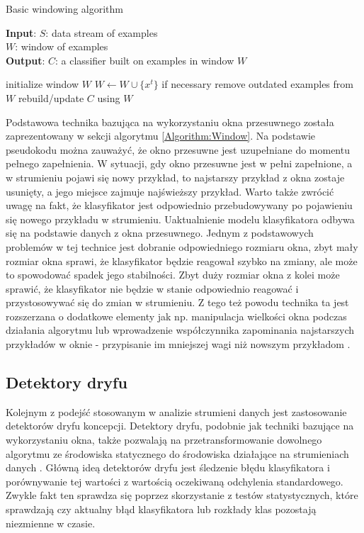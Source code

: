 \newpage

\begin{algorithm}
    \caption{Basic windowing algorithm \cite{BrzezPhd2015}}\label{Algorithm:Window}
    \textbf{Input}: $S$: data stream of examples \\
    \hspace*{12mm} $W$: window of examples \\
    \textbf{Output}: $C$: a classifier built on examples in window $W$ \\
    \begin{algorithmic}[1]
    \State initialize window $W$
    \State $W \gets W \cup \{x^t\}$
    \State if necessary remove outdated examples from $W$
    \State rebuild/update $C$ using $W$
    \EndFor
    \end{algorithmic}
\end{algorithm}

\noindent Podstawowa technika bazująca na wykorzystaniu okna przesuwnego została zaprezentowany w sekcji algorytmu \ref{Algorithm:Window}. Na podstawie pseudokodu można zauważyć, że okno przesuwne jest uzupełniane do momentu pełnego zapełnienia. W sytuacji, gdy okno przesuwne jest w pełni zapełnione, a w strumieniu pojawi się nowy przykład, to najstarszy przykład z okna zostaje usunięty, a jego miejsce zajmuje najświeższy przykład. Warto także zwrócić uwagę na fakt, że klasyfikator jest odpowiednio przebudowywany po pojawieniu się nowego przykładu w strumieniu. Uaktualnienie modelu klasyfikatora odbywa się na podstawie danych z okna przesuwnego. Jednym z podstawowych problemów w tej technice jest dobranie odpowiedniego rozmiaru okna, zbyt mały rozmiar okna sprawi, że klasyfikator będzie reagował szybko na zmiany, ale może to spowodować spadek jego stabilności. Zbyt duży rozmiar okna z kolei może sprawić, że klasyfikator nie będzie w stanie odpowiednio reagować i przystosowywać się do zmian w strumieniu. Z tego też powodu technika ta jest rozszerzana o dodatkowe elementy jak np. manipulacja wielkości okna podczas działania algorytmu lub wprowadzenie współczynnika zapominania najstarszych przykładów w oknie - przypisanie im mniejszej wagi niż nowszym przykładom \cite{BrzezPhd2015}.

\subsection{Detektory dryfu}

\noindent Kolejnym z podejść stosowanym w analizie strumieni danych jest zastosowanie detektorów dryfu koncepcji. Detektory dryfu, podobnie jak techniki bazujące na wykorzystaniu okna, także pozwalają na przetransformowanie dowolnego algorytmu ze środowiska statycznego do środowiska działające na strumieniach danych \cite{Article:DriftGama2}. Główną ideą detektorów dryfu jest śledzenie błędu klasyfikatora i porównywanie tej wartości z wartością oczekiwaną odchylenia standardowego. Zwykle fakt ten sprawdza się poprzez skorzystanie z testów statystycznych, które sprawdzają czy aktualny błąd klasyfikatora lub rozkłady klas pozostają niezmienne w czasie.


